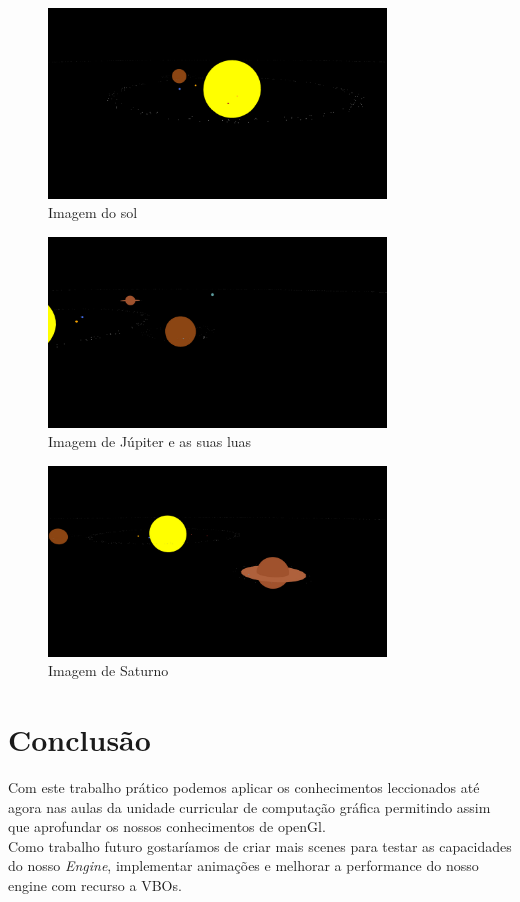 \documentclass[a4paper]{report}
\begin{document}
\begin{figure}[H]
    \centering 
    \includegraphics[width=0.8\textwidth]{images/sun.png}  
    \caption{Imagem do sol}
    \label{fig:sun}
\end{figure}
\begin{figure}[H]
    \centering 
    \includegraphics[width=0.8\textwidth]{images/jupiter.png}  
    \caption{Imagem de Júpiter e as suas luas}
    \label{fig:jupiter}
\end{figure}
\begin{figure}[H]
    \centering 
    \includegraphics[width=0.8\textwidth]{images/saturno.png}  
    \caption{Imagem de Saturno}
    \label{fig:saturn}
\end{figure}

\chapter{Conclusão}
Com este trabalho prático podemos aplicar os conhecimentos leccionados até agora
nas aulas da unidade curricular de computação gráfica permitindo assim que
aprofundar os nossos conhecimentos de openGl.\\
Como trabalho futuro gostaríamos de criar mais scenes para testar as capacidades
do nosso \textit{Engine}, implementar animações e melhorar a performance do
nosso engine com recurso a VBOs.
\end{document}
